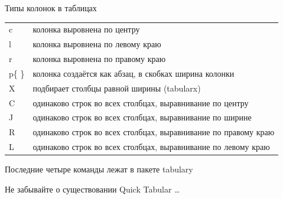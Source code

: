 \documentclass[aspectratio=169]{beamer} %
\begin{document}
\begin{frame}
\begin{block}{Типы колонок в таблицах}
\centering 
	\begin{tabulary}{\textwidth}{JL}
		\toprule
			c & колонка выровнена по центру \\
			l & колонка выровнена по левому краю\\
			r & колонка выровнена по правому краю\\
	   p\{ \} & колонка создаётся как абзац, в скобках ширина колонки \\
		   X  & подбирает столбцы равной ширины (tabularx) \\
		   C  & одинаково строк во всех столбцах, выравнивание по центру  \\	  
		   J  & одинаково строк во всех столбцах, выравнивание по ширине \\
		   R  & одинаково строк во всех столбцах, выравнивание по правому краю \\
		   L  & одинаково строк во всех столбцах, выравнивание по левому краю  \\
		\bottomrule
	\end{tabulary}
\end{block}
\vspace{0.1cm} \centering
\large Последние четыре команды лежат в пакете tabulary

\alert{Не забывайте о существовании Quick Tabular \ldots}

\end{frame}
\end{document}
